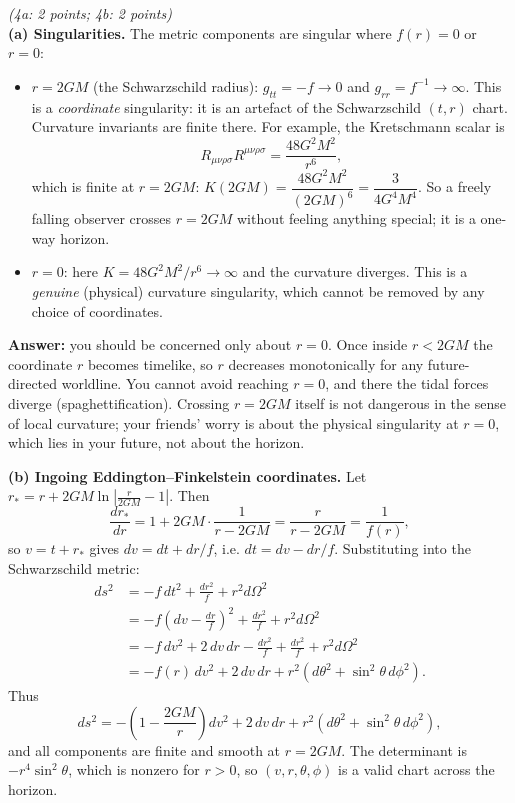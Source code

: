 \documentclass[12pt]{article}
\newcommand{\be}{\begin{equation}}
\newcommand{\ee}{\end{equation}}
\newcounter{ansno}
\newcommand{\ans}[1]{\vspace{2em}\stepcounter{ansno}
\noindent{\bf Question \theansno.} \emph{(#1)}\\[0.5em]
}
\begin{document}
\ans{4a: 2 points; 4b: 2 points}
\textbf{(a) Singularities.} The metric components are singular where $f(r)=0$ or $r=0$:
\begin{itemize}
\item $r = 2GM$ (the Schwarzschild radius): $g_{tt}=-f\to 0$ and $g_{rr}=f^{-1}\to\infty$. This is a \emph{coordinate} singularity: it is an artefact of the Schwarzschild $(t,r)$ chart. Curvature invariants are finite there. For example, the Kretschmann scalar is
\be
R_{\mu\nu\rho\sigma}R^{\mu\nu\rho\sigma} = \frac{48 G^2M^2}{r^6},
\ee
which is finite at $r=2GM$: $K(2GM) = \dfrac{48G^2M^2}{(2GM)^6} = \dfrac{3}{4G^4M^4}$. So a freely falling observer crosses $r=2GM$ without feeling anything special; it is a one-way horizon.
\item $r = 0$: here $K = 48G^2M^2/r^6 \to \infty$ and the curvature diverges. This is a \emph{genuine} (physical) curvature singularity, which cannot be removed by any choice of coordinates.
\end{itemize}
\textbf{Answer:} you should be concerned only about $r=0$. Once inside $r<2GM$ the coordinate $r$ becomes timelike, so $r$ decreases monotonically for any future-directed worldline. You cannot avoid reaching $r=0$, and there the tidal forces diverge (spaghettification). Crossing $r=2GM$ itself is not dangerous in the sense of local curvature; your friends' worry is about the physical singularity at $r=0$, which lies in your future, not about the horizon.

\textbf{(b) Ingoing Eddington--Finkelstein coordinates.} Let $r_* = r + 2GM\ln\left|\frac{r}{2GM}-1\right|$. Then
\be
\frac{dr_*}{dr} = 1 + 2GM\cdot\frac{1}{r-2GM} = \frac{r}{r-2GM} = \frac{1}{f(r)},
\ee
so $v = t + r_*$ gives $dv = dt + dr/f$, i.e. $dt = dv - dr/f$. Substituting into the Schwarzschild metric:
\begin{align*}
ds^2 &= -f\,dt^2 + \frac{dr^2}{f} + r^2 d\Omega^2 \\
&= -f\left(dv - \frac{dr}{f}\right)^2 + \frac{dr^2}{f} + r^2 d\Omega^2 \\
&= -f\,dv^2 + 2\,dv\,dr - \frac{dr^2}{f} + \frac{dr^2}{f} + r^2 d\Omega^2 \\
&= -f(r)\,dv^2 + 2\,dv\,dr + r^2\left(d\theta^2 + \sin^2\theta\, d\phi^2\right).
\end{align*}
Thus
\be
ds^2 = -\left(1-\frac{2GM}{r}\right)dv^2 + 2\,dv\,dr + r^2\left(d\theta^2+\sin^2\theta\,d\phi^2\right),
\ee
and all components are finite and smooth at $r=2GM$. The determinant is $-r^4\sin^2\theta$, which is nonzero for $r>0$, so $(v,r,\theta,\phi)$ is a valid chart across the horizon.
\end{document}
